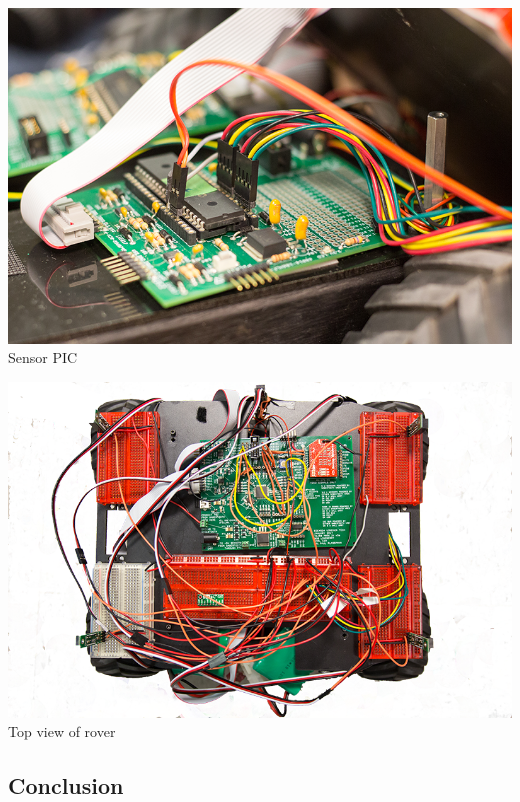 \begin{center}
	\includegraphics[scale=0.35]{Images/sensor.png}
	Sensor PIC
\end{center}
\begin{center}
	\includegraphics[scale=0.35]{Images/rover.png}
	Top view of rover
\end{center}

\subsection{Conclusion}



